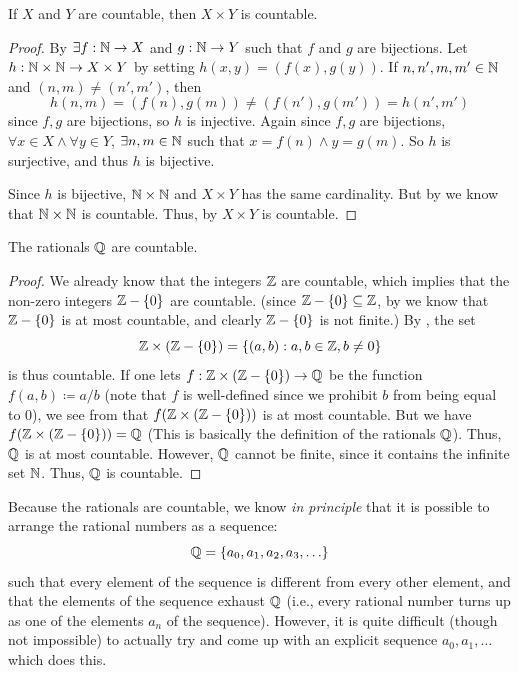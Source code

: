 \begin{cor}\label{i:8.1.14}
  If \(X\) and \(Y\) are countable, then \(X \times Y\) is countable.
\end{cor}

\begin{proof}
  By  \(\exists f : \mathbb{N} \to X\) and \(g : \mathbb{N} \to Y\) such that \(f\) and \(g\) are bijections.
  Let \(h : \mathbb{N} \times \mathbb{N} \to X \times Y\) by setting \(h(x, y) = (f(x), g(y))\).
  If \(n, n', m, m' \in \mathbb{N}\) and \((n, m) \neq (n', m')\), then
  \[
    h(n, m) = (f(n), g(m)) \neq (f(n'), g(m')) = h(n', m')
  \]
  since \(f, g\) are bijections, so \(h\) is injective.
  Again since \(f, g\) are bijections, \(\forall x \in X \land \forall y \in Y\), \(\exists n, m \in \mathbb{N}\) such that \(x = f(n) \land y = g(m)\).
  So \(h\) is surjective, and thus \(h\) is bijective.

  Since \(h\) is bijective, \(\mathbb{N} \times \mathbb{N}\) and \(X \times Y\) has the same cardinality.
  But by  we know that \(\mathbb{N} \times \mathbb{N}\) is countable.
  Thus, by  \(X \times Y\) is countable.
\end{proof}

\begin{cor}\label{i:8.1.15}
  The rationals \(\mathbb{Q}\) are countable.
\end{cor}

\begin{proof}
  We already know that the integers \(\mathbb{Z}\) are countable, which implies that the non-zero integers \(\mathbb{Z} - \left\lbrace0\right\rbrace\) are countable.
  (since \(\mathbb{Z} - \left\lbrace0\right\rbrace \subseteq \mathbb{Z}\), by  we know that \(\mathbb{Z} - \left\lbrace0\right\rbrace\) is at most countable, and clearly \(\mathbb{Z} - \left\lbrace0\right\rbrace\) is not finite.)
  By , the set
  \[
    \mathbb{Z} \times (\mathbb{Z} - \left\lbrace0\right\rbrace) = \left\lbrace(a, b) : a, b \in \mathbb{Z}, b \neq 0\right\rbrace
  \]
  is thus countable.
  If one lets \(f : \mathbb{Z} \times (\mathbb{Z} - \left\lbrace0\right\rbrace) \to \mathbb{Q}\) be the function \(f(a, b) \coloneqq a / b\)
  (note that \(f\) is well-defined since we prohibit \(b\) from being equal to \(0\)), we see from  that \(f(\mathbb{Z} \times (\mathbb{Z} - \left\lbrace0\right\rbrace))\) is at most countable.
  But we have \(f(\mathbb{Z} \times (\mathbb{Z} - \left\lbrace0\right\rbrace)) = \mathbb{Q}\)
  (This is basically the definition of the rationals \(\mathbb{Q}\)).
  Thus, \(\mathbb{Q}\) is at most countable.
  However, \(\mathbb{Q}\) cannot be finite, since it contains the infinite set \(\mathbb{N}\).
  Thus, \(\mathbb{Q}\) is countable.
\end{proof}

\begin{rmk}\label{i:8.1.16}
  Because the rationals are countable, we know \emph{in principle} that it is possible to arrange the rational numbers as a sequence:
  \[
    \Q = \set{a_0, a_1, a_2, a_3, \dots}
  \]
  such that every element of the sequence is different from every other element, and that the elements of the sequence exhaust \(\mathbb{Q}\)
  (i.e., every rational number turns up as one of the elements \(a_n\) of the sequence).
  However, it is quite difficult (though not impossible) to actually try and come up with an explicit sequence \(a_0, a_1, \dots\) which does this.
\end{rmk}

